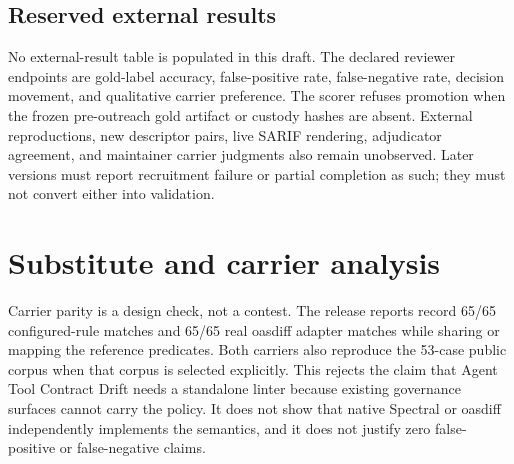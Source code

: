 \documentclass[11pt,letterpaper]{article}
\newcommand{\project}{Agent Tool Contract Drift}
\newcommand{\sarif}{SARIF}
\begin{document}
\subsection{Reserved external results}

No external-result table is populated in this draft. The declared reviewer endpoints are gold-label accuracy, false-positive rate, false-negative rate, decision movement, and qualitative carrier preference. The scorer refuses promotion when the frozen pre-outreach gold artifact or custody hashes are absent. External reproductions, new descriptor pairs, live \sarif{} rendering, adjudicator agreement, and maintainer carrier judgments also remain unobserved. Later versions must report recruitment failure or partial completion as such; they must not convert either into validation.

\section{Substitute and carrier analysis}

Carrier parity is a design check, not a contest. The release reports record 65/65 configured-rule matches and 65/65 real oasdiff adapter matches while sharing or mapping the reference predicates. Both carriers also reproduce the 53-case public corpus when that corpus is selected explicitly. This rejects the claim that \project{} needs a standalone linter because existing governance surfaces cannot carry the policy. It does not show that native Spectral or oasdiff independently implements the semantics, and it does not justify zero false-positive or false-negative claims.
\end{document}
